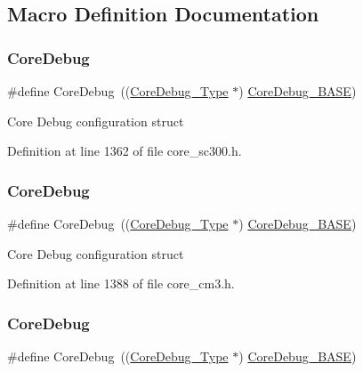 \subsection{Macro Definition Documentation}
\mbox{\label{group___c_m_s_i_s__core__base_gab6e30a2b802d9021619dbb0be7f5d63d}} 
\subsubsection{\texorpdfstring{Core\+Debug}{CoreDebug}\hspace{0.1cm}{\footnotesize\ttfamily [1/4]}}
{\footnotesize\ttfamily \#define Core\+Debug~((\hyperlink{struct_core_debug___type}{Core\+Debug\+\_\+\+Type} $\ast$)     \hyperlink{group___c_m_s_i_s__core__base_ga680604dbcda9e9b31a1639fcffe5230b}{Core\+Debug\+\_\+\+B\+A\+SE})}

Core Debug configuration struct 

Definition at line 1362 of file core\+\_\+sc300.\+h.

\mbox{\label{group___c_m_s_i_s__core__base_gab6e30a2b802d9021619dbb0be7f5d63d}} 
\subsubsection{\texorpdfstring{Core\+Debug}{CoreDebug}\hspace{0.1cm}{\footnotesize\ttfamily [2/4]}}
{\footnotesize\ttfamily \#define Core\+Debug~((\hyperlink{struct_core_debug___type}{Core\+Debug\+\_\+\+Type} $\ast$)     \hyperlink{group___c_m_s_i_s__core__base_ga680604dbcda9e9b31a1639fcffe5230b}{Core\+Debug\+\_\+\+B\+A\+SE})}

Core Debug configuration struct 

Definition at line 1388 of file core\+\_\+cm3.\+h.

\mbox{\label{group___c_m_s_i_s__core__base_gab6e30a2b802d9021619dbb0be7f5d63d}} 
\subsubsection{\texorpdfstring{Core\+Debug}{CoreDebug}\hspace{0.1cm}{\footnotesize\ttfamily [3/4]}}
{\footnotesize\ttfamily \#define Core\+Debug~((\hyperlink{struct_core_debug___type}{Core\+Debug\+\_\+\+Type} $\ast$)     \hyperlink{group___c_m_s_i_s__core__base_ga680604dbcda9e9b31a1639fcffe5230b}{Core\+Debug\+\_\+\+B\+A\+SE})}

